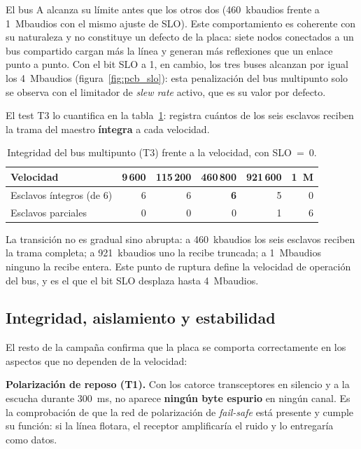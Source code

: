 El bus A alcanza su límite antes que los otros dos (460~kbaudios frente a 1~Mbaudios con el mismo ajuste de
SLO). Este comportamiento es coherente con su naturaleza y no constituye un defecto de la placa:
siete nodos conectados a un bus compartido cargan más la línea y generan más reflexiones que un
enlace punto a punto. Con el bit SLO a 1, en cambio, los tres buses alcanzan por igual los
4~Mbaudios (figura~\ref{fig:pcb_slo}): esta penalización del bus multipunto solo se observa con el
limitador de \textit{slew rate} activo, que es su valor por defecto.

El test T3 lo cuantifica en la tabla~\ref{tab:pcb_multidrop}: registra cuántos de los seis esclavos
reciben la trama del maestro \textbf{íntegra} a cada velocidad.

\begin{table}[H]
    \centering
    \begin{tabular}{lrrrrr}
        \hline
        \textbf{Velocidad} & 9\,600 & 115\,200 & 460\,800 & 921\,600 & 1~M \\
        \hline
        Esclavos íntegros (de 6) & 6 & 6 & \textbf{6} & 5 & 0 \\
        Esclavos parciales       & 0 & 0 & 0 & 1 & 6 \\
        \hline
    \end{tabular}
    \caption{Integridad del bus multipunto (T3) frente a la velocidad, con SLO~=~0.}
    \label{tab:pcb_multidrop}
\end{table}

La transición no es gradual sino abrupta: a 460~kbaudios los seis esclavos reciben la trama completa; a
921~kbaudios uno la recibe truncada; a 1~Mbaudios ninguno la recibe entera. Este punto de ruptura define la
velocidad de operación del bus, y es el que el bit SLO desplaza hasta 4~Mbaudios.

\subsection{Integridad, aislamiento y estabilidad}

El resto de la campaña confirma que la placa se comporta correctamente en los aspectos que no
dependen de la velocidad:

\textbf{Polarización de reposo (T1).} Con los catorce transceptores en silencio y a la escucha
durante 300~ms, no aparece \textbf{ningún byte espurio} en ningún canal. Es la comprobación de que
la red de polarización de \textit{fail-safe} está presente y cumple su función: si la línea flotara,
el receptor amplificaría el ruido y lo entregaría como datos.

